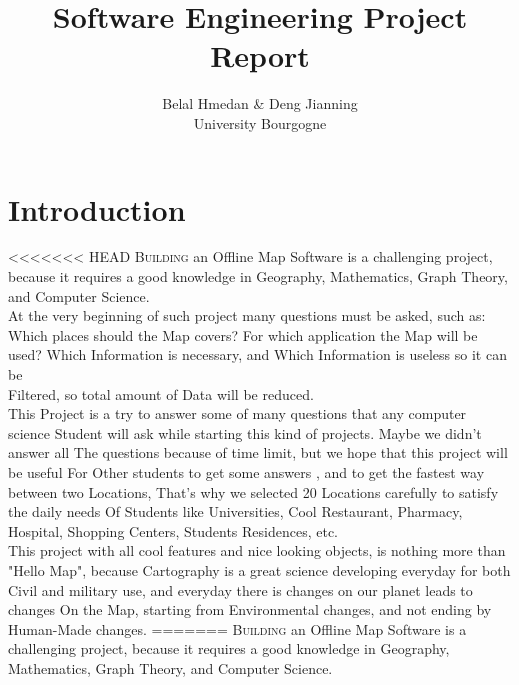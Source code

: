 \documentclass[a4paper, 12pt, english]{book}
\title{\textbf{Software Engineering Project Report}}
\begin{document}
\author{Belal Hmedan \& Deng Jianning\\University Bourgogne}
\maketitle
\let\cleardoublepage\clearpage
\tableofcontents
\chapter*{Introduction}
 
<<<<<<< HEAD
\lettrine{B}{uilding} an Offline Map Software is a challenging project, because it requires a good knowledge in Geography, Mathematics, Graph Theory, and Computer Science.
\\At the very beginning of such project many questions must be asked, such as: \\Which places should the Map covers? For which application the Map will be used?
Which Information is necessary, and Which Information is useless so it can be \\Filtered, so total amount of Data will be reduced.
\\This Project is a try to answer some of many questions that any computer science Student will ask while starting this kind of projects. Maybe we didn't answer all The questions because of time limit, but we hope that this project will be useful For Other students to get some answers , and to get the fastest way between two Locations, That's why we selected 20 Locations carefully to satisfy the daily needs Of Students like Universities, Cool Restaurant, Pharmacy, Hospital, Shopping Centers, Students Residences, etc.
\\This project with all cool features and nice looking objects, is nothing more than "Hello Map", because Cartography is a great science developing everyday for both Civil and military use, and everyday there is changes on our planet leads to changes On the Map, starting from Environmental changes, and not ending by Human-Made changes. 
=======
\lettrine{B}{uilding} an Offline Map Software is a challenging project, 
because it requires a good knowledge in Geography, Mathematics, 
Graph Theory, and Computer Science.\\
\end{document}
